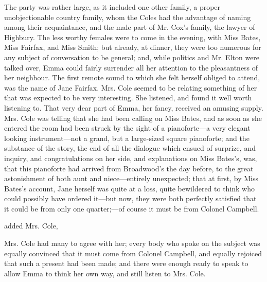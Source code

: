 The party was rather large, as it included one other family, a proper unobjectionable country family, whom the Coles had the advantage of naming among their acquaintance, and the male part of Mr. Cox's family, the lawyer of Highbury. The less worthy females were to come in the evening, with Miss Bates, Miss Fairfax, and Miss Smith; but already, at dinner, they were too numerous for any subject of conversation to be general; and, while politics and Mr. Elton were talked over, Emma could fairly surrender all her attention to the pleasantness of her neighbour. The first remote sound to which she felt herself obliged to attend, was the name of Jane Fairfax. Mrs. Cole seemed to be relating something of her that was expected to be very interesting. She listened, and found it well worth listening to. That very dear part of Emma, her fancy, received an amusing supply. Mrs. Cole was telling that she had been calling on Miss Bates, and as soon as she entered the room had been struck by the sight of a pianoforte---a very elegant looking instrument---not a grand, but a large-sized square pianoforte; and the substance of the story, the end of all the dialogue which ensued of surprize, and inquiry, and congratulations on her side, and explanations on Miss Bates's, was, that this pianoforte had arrived from Broadwood's the day before, to the great astonishment of both aunt and niece---entirely unexpected; that at first, by Miss Bates's account, Jane herself was quite at a loss, quite bewildered to think who could possibly have ordered it---but now, they were both perfectly satisfied that it could be from only one quarter;---of course it must be from Colonel Campbell.

 added Mrs. Cole, 

Mrs. Cole had many to agree with her; every body who spoke on the subject was equally convinced that it must come from Colonel Campbell, and equally rejoiced that such a present had been made; and there were enough ready to speak to allow Emma to think her own way, and still listen to Mrs. Cole.

